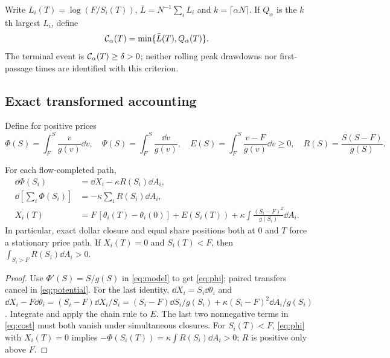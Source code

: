 \documentclass[review,hidelinks,onefignum,onetabnum]{siamonline250211}%
\begin{document}
\begin{definition}\label{def:crisis}
Write $L_i(T)=\log(F/S_i(T))$, $\bar L=N^{-1}\sum_iL_i$ and
$k=\lceil\alpha N\rceil$. If $Q_\alpha$ is the $k$th largest $L_i$, define
\begin{equation}\label{eq:crisis}
 \mathcal{C}_\alpha(T)=\min\{\bar L(T),Q_\alpha(T)\}.
\end{equation}
The terminal event is $\mathcal{C}_\alpha(T)\ge\delta>0$; neither rolling
peak drawdowns nor first-passage times are identified with this criterion.
\end{definition}

\subsection{Exact transformed accounting}
Define for positive prices
\begin{equation}\label{eq:coords}
 \Phi(S)=\int_F^S\frac{v}{g(v)}\dd v,\quad
 \Psi(S)=\int_F^S\frac{\dd v}{g(v)},\quad
 E(S)=\int_F^S\frac{v-F}{g(v)}\dd v\ge0,\quad
 R(S)=\frac{S(S-F)}{g(S)}.
\end{equation}
\begin{proposition}\label{prop:account}
For each flow-completed path,
\begin{align}
 \dd\Phi(S_i)&=\dd X_i-\kappa R(S_i)\dd A_i,\label{eq:phi}\\
 \dd\left[\sum_i\Phi(S_i)\right]&=-\kappa\sum_iR(S_i)\dd A_i,\label{eq:potential}\\
 X_i(T)&=F\,[\theta_i(T)-\theta_i(0)]+E(S_i(T))
  +\kappa\int\frac{(S_i-F)^2}{g(S_i)}\dd A_i.\label{eq:cost}
\end{align}
In particular, exact dollar closure and equal share positions both at $0$
and $T$ force a stationary price path. If $X_i(T)=0$ and $S_i(T)<F$,
then $\int_{S_i>F}R(S_i)\dd A_i>0$.
\end{proposition}
\begin{proof}
Use $\Phi'(S)=S/g(S)$ in \eqref{eq:model} to get \eqref{eq:phi};
paired transfers cancel in \eqref{eq:potential}. For the last identity,
$\dd X_i=S_i\dd\theta_i$ and
$\dd X_i-F\dd\theta_i=(S_i-F)\dd X_i/S_i
=(S_i-F)\dd S_i/g(S_i)+\kappa(S_i-F)^2\dd A_i/g(S_i)$.
Integrate and apply the chain rule to $E$.
The last two nonnegative terms in \eqref{eq:cost} must both vanish under
simultaneous closures. For $S_i(T)<F$, \eqref{eq:phi} with $X_i(T)=0$
implies $-\Phi(S_i(T))=\kappa\int R(S_i)\dd A_i>0$;
$R$ is positive only above $F$.
\end{proof}
\end{document}
